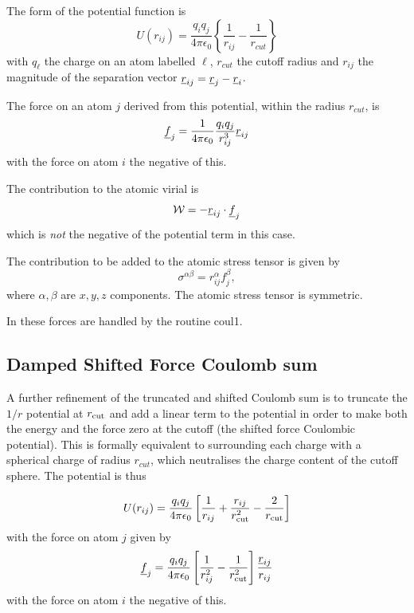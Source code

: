 The form of the potential function is
\begin{equation}
U(r_{ij})=\frac{q_{i}q_{j}}{4\pi\epsilon_{0}}\left\{\frac{1}{r_{ij}}-
\frac{1}{r_{cut}}\right\}
\end{equation}
with $q_{\ell}$ the charge on an atom labelled $\ell$, $r_{cut}$ the
cutoff radius and $r_{ij}$ the magnitude of the separation vector
$\mbox{$\underline{r}$}_{ij}=\mbox{$\underline{r}$}_{j}-\mbox{$\underline{r}$}_{i}$.

The force on an atom $j$ derived from this potential, within the radius
$r_{cut}$, is
\begin{equation}
\mbox{$\underline{f}$}_{j}=\frac{1}{4\pi\epsilon_{0}}\frac{q_{i}q_{j}}{r_{ij}^{3}}\mbox{$\underline{r}$}_{ij}
\end{equation}
with the force on atom $i$ the negative of this.

The contribution to the atomic virial is
\begin{equation}
{\cal W}=-\mbox{$\underline{r}$}_{ij}\cdot\mbox{$\underline{f}$}_{j}
\end{equation}
which is {\em not} the negative of the potential term in this case.

The contribution to be added to the atomic stress tensor is
given by
\begin{equation}
\sigma^{\alpha \beta}=r_{ij}^{\alpha}f_{j}^{\beta},
\end{equation}
where $\alpha,\beta$ are $x,y,z$ components. The atomic stress tensor
is symmetric.

In \D{} these forces are handled by the routine {\sc coul1}.

\subsection{Damped Shifted Force Coulomb sum}
\label{wolf}
A further refinement of the truncated and shifted Coulomb sum is to
truncate the $1/r$ potential at $r_{\rm cut}$ and add a linear term to
the potential in order to make both the energy and the force zero at
the cutoff (the shifted force Coulombic potential). This is formally
equivalent to surrounding each charge with a spherical charge of
radius $r_{cut}$, which neutralises the charge content of the cutoff
sphere. The potential is thus

\begin{equation}
U(r_{ij}) = {q_i q_j \over 4\pi\epsilon_0} \left[ {1\over r_{ij}} + 
{r_{ij}\over r_{\rm cut}^2} - {2\over r_{\rm cut}} \right]
\end{equation}
with  the force on atom $j$ given by
\begin{equation}
\mbox{$\underline{f}$}_{j}=\frac{q_{i}q_{j}}{4\pi\epsilon_{0}}
\left[ {1\over r_{ij}^2} - {1\over r_{\rm cut}^2} \right]
\frac{\mbox{$\underline{r}$}_{ij}}{r_{ij}}
\end{equation}
with the force on atom $i$ the negative of this.

